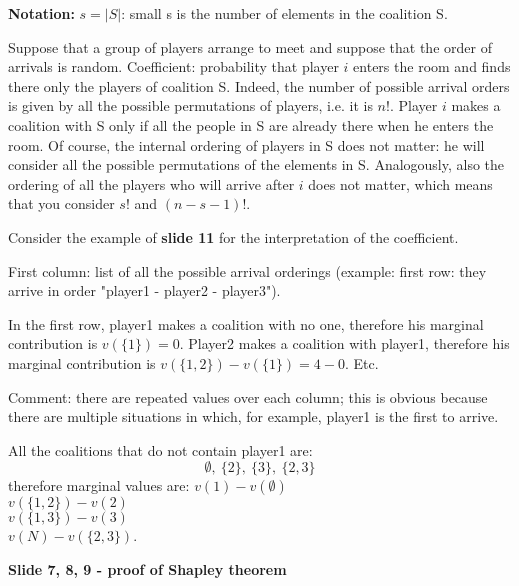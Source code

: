 \documentclass[pt11,a4paper,twoside,reqno,openright]{paper}
\begin{document}
\noindent \textbf{Notation:} $s = |S|$: small s is the number of elements in 
the coalition S.

\noindent Suppose that a group of players arrange to meet and suppose that 
the order of arrivals is random. Coefficient: probability that player $i$ 
enters the room and finds there only the players of coalition S. Indeed, the 
number of possible arrival orders is given by all the possible permutations of 
players, i.e. it is $n!$. Player $i$ makes a coalition with S only if all the 
people in S are already there when he enters the room. Of course, the internal 
ordering of players in S does not matter: he will consider all the possible 
permutations of the elements in S. Analogously, also the ordering of all the 
players who will arrive after $i$ does not matter, which means that you 
consider $s!$ and $(n-s-1)!$.

\noindent Consider the example of \textbf{slide 11} for the interpretation of 
the coefficient.

\noindent First column: list of all the possible arrival orderings (example: 
first row: they arrive in order "player1 - player2 - player3").

\noindent In the first row, player1 makes a coalition with no one, therefore 
his marginal contribution is $v(\{1\}) = 0$. Player2 makes a coalition with 
player1, therefore his marginal contribution is $v(\{1,2\}) - v(\{1\}) = 4 - 0$. 
Etc.

\noindent Comment: there are repeated values over each column; this is obvious 
because there are multiple situations in which, for example, player1 is the 
first to arrive. 

\noindent All the coalitions that do not contain player1 are:
\[
	\emptyset,~ \{2\},~ \{3\},~ \{2,3\}
\]
therefore marginal values are:
$v(1) - v(\emptyset)$\\
$v(\{1,2\}) - v(2)$\\
$v(\{1,3\}) - v(3)$\\
$v(N) - v(\{2,3\})$.

\bigskip
\noindent \textbf{Slide 7, 8, 9 - proof of Shapley theorem}
\end{document}
